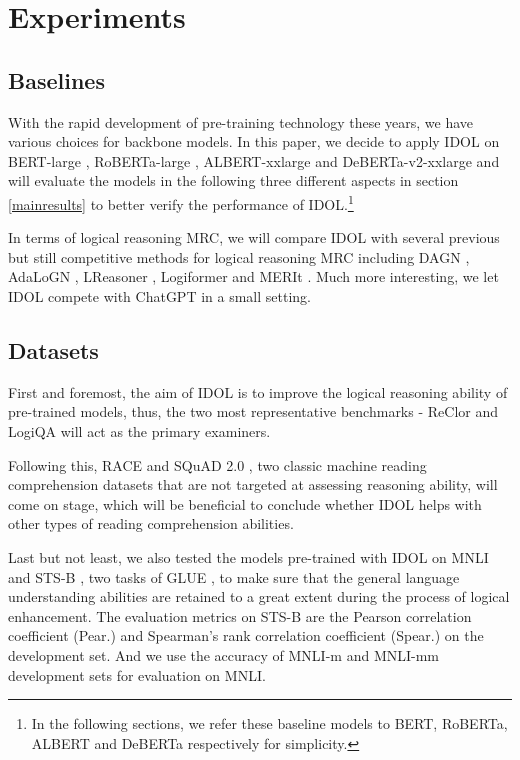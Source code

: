 \documentclass[11pt]{article}
\begin{document}
\section{Experiments}

\subsection{Baselines}

With the rapid development of pre-training technology these years, we have various choices for backbone models. In this paper, we decide to apply IDOL on BERT-large \cite{bert}, RoBERTa-large \cite{roberta}, ALBERT-xxlarge \cite{albert} and DeBERTa-v2-xxlarge \cite{deberta} and will evaluate the models in the following three different aspects in section \ref{mainresults} to better verify the performance of IDOL.\footnote{In the following sections, we refer these baseline models to BERT, RoBERTa, ALBERT and DeBERTa respectively for simplicity.} 

In terms of logical reasoning MRC, we will compare IDOL with several previous but still competitive methods for logical reasoning MRC including DAGN \cite{huang-etal-2021-dagn}, AdaLoGN \cite{li-etal-2022-adalogn}, LReasoner \cite{wang-etal-2022-logic}, Logiformer \cite{logiformer} and MERIt \cite{jiao-etal-2022-merit}. Much more interesting, we let IDOL compete with ChatGPT in a small setting.

\subsection{Datasets}

First and foremost, the aim of IDOL is to improve the logical reasoning ability of pre-trained models, thus, the two most representative benchmarks - ReClor and LogiQA will act as the primary examiners.

Following this, RACE \cite{lai-etal-2017-race} and SQuAD 2.0 \cite{squad2.0}, two classic machine reading comprehension datasets that are not targeted at assessing reasoning ability, will come on stage, which will be beneficial to conclude whether IDOL helps with other types of reading comprehension abilities.

Last but not least, we also tested the models pre-trained with IDOL on MNLI \cite{mnli} and STS-B \cite{stsb}, two tasks of GLUE \cite{glue}, to make sure that the general language understanding abilities are retained to a great extent during the process of logical enhancement. The evaluation metrics on STS-B are the Pearson correlation coefficient (Pear.) and Spearman's rank correlation coefficient (Spear.) on the development set. And we use the accuracy of MNLI-m and MNLI-mm development sets for evaluation on MNLI.
\end{document}
